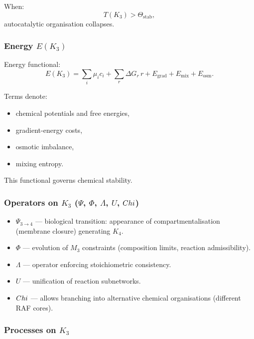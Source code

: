 When:
\[
T(K_3) > \Theta_{\mathrm{stab}},
\]
autocatalytic organisation collapses.

\subsubsection{Energy \texorpdfstring{$E(K_3)$}{E(K_3)}}

Energy functional:
\[
E(K_3) =
\sum_i \mu_i c_i +
\sum_r \Delta G_r\, r +
E_{\mathrm{grad}} + E_{\mathrm{mix}} + E_{\mathrm{osm}}.
\]

Terms denote:
\begin{itemize}
    \item chemical potentials and free energies,
    \item gradient-energy costs,
    \item osmotic imbalance,
    \item mixing entropy.
\end{itemize}

This functional governs chemical stability.

\subsubsection{Operators on \texorpdfstring{$K_3$}{K_3} (\texorpdfstring{$\Psi$}{\Psi}, \texorpdfstring{$\Phi$}{\Phi}, \texorpdfstring{$\Lambda$}{\Lambda}, \texorpdfstring{$U$}{U}, \texorpdfstring{$Chi$}{\Chi})}

\begin{itemize}
    \item $\Psi_{3\to4}$ — biological transition: appearance of
          compartmentalisation (membrane closure) generating $K_4$.
    \item $\Phi$ — evolution of $M_3$ constraints (composition limits,
          reaction admissibility).
    \item $\Lambda$ — operator enforcing stoichiometric consistency.
    \item $U$ — unification of reaction subnetworks.
    \item $Chi$ — allows branching into alternative chemical
          organisations (different RAF cores).
\end{itemize}

\subsubsection{Processes on \texorpdfstring{$K_3$}{K_3}}

